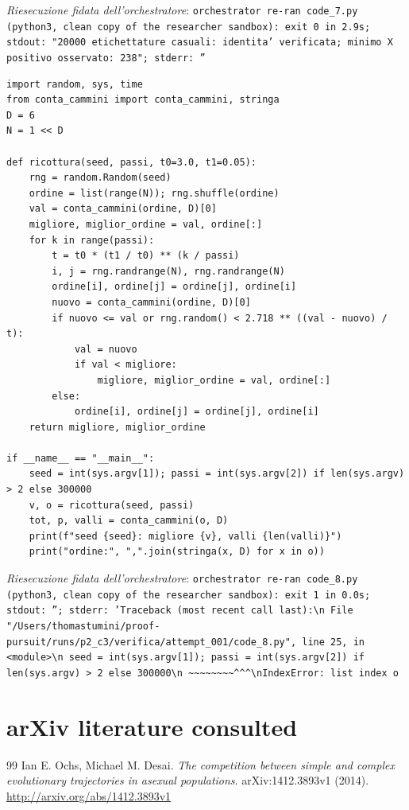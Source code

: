 \documentclass[11pt,a4paper]{article}
\begin{document}
\noindent\emph{Riesecuzione fidata dell'orchestratore}: \texttt{orchestrator re-ran code\_7.py (python3, clean copy of the researcher sandbox): exit 0 in 2.9s; stdout: "20000 etichettature casuali: identita' verificata; minimo X positivo osservato: 238"; stderr: ''}
\begin{lstlisting}[caption={attempt\_001 code\_8 [python, rigore float\_exploration\_only] — Simulated annealing over labellings of Q\_6 (exploration only, 300k swap moves per seed, ex — approvato dal Referee}]
import random, sys, time
from conta_cammini import conta_cammini, stringa
D = 6
N = 1 << D

def ricottura(seed, passi, t0=3.0, t1=0.05):
    rng = random.Random(seed)
    ordine = list(range(N)); rng.shuffle(ordine)
    val = conta_cammini(ordine, D)[0]
    migliore, miglior_ordine = val, ordine[:]
    for k in range(passi):
        t = t0 * (t1 / t0) ** (k / passi)
        i, j = rng.randrange(N), rng.randrange(N)
        ordine[i], ordine[j] = ordine[j], ordine[i]
        nuovo = conta_cammini(ordine, D)[0]
        if nuovo <= val or rng.random() < 2.718 ** ((val - nuovo) / t):
            val = nuovo
            if val < migliore:
                migliore, miglior_ordine = val, ordine[:]
        else:
            ordine[i], ordine[j] = ordine[j], ordine[i]
    return migliore, miglior_ordine

if __name__ == "__main__":
    seed = int(sys.argv[1]); passi = int(sys.argv[2]) if len(sys.argv) > 2 else 300000
    v, o = ricottura(seed, passi)
    tot, p, valli = conta_cammini(o, D)
    print(f"seed {seed}: migliore {v}, valli {len(valli)}")
    print("ordine:", ",".join(stringa(x, D) for x in o))

\end{lstlisting}
\noindent\emph{Riesecuzione fidata dell'orchestratore}: \texttt{orchestrator re-ran code\_8.py (python3, clean copy of the researcher sandbox): exit 1 in 0.0s; stdout: ''; stderr: 'Traceback (most recent call last):\textbackslash{}n  File "/Users/thomastumini/proof-pursuit/runs/p2\_c3/verifica/attempt\_001/code\_8.py", line 25, in \textless{}module\textgreater{}\textbackslash{}n    seed = int(sys.argv[1]); passi = int(sys.argv[2]) if len(sys.argv) \textgreater{} 2 else 300000\textbackslash{}n               \textasciitilde{}\textasciitilde{}\textasciitilde{}\textasciitilde{}\textasciitilde{}\textasciitilde{}\textasciitilde{}\textasciitilde{}\textasciicircum{}\textasciicircum{}\textasciicircum{}\textbackslash{}nIndexError: list index o}

\section{arXiv literature consulted}
\begin{thebibliography}{99}
 Ian E. Ochs, Michael M. Desai. \emph{The competition between simple and complex evolutionary trajectories in asexual populations}. arXiv:1412.3893v1 (2014). \url{http://arxiv.org/abs/1412.3893v1}
\end{thebibliography}
\end{document}
